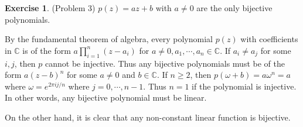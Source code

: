 \documentclass[12pt, psamsfonts]{amsart}
\theoremstyle{definition}
\newtheorem*{exer}{Exercise}
\theoremstyle{remark}
\numberwithin{equation}{section}
\begin{document}
\begin{exer}{(Problem 3)}
  $p(z) = az + b$ with $a \ne 0$ are the only bijective polynomials.

  By the fundamental theorem of algebra, every polynomial $p(z)$ with coefficients in $\mathbb{C}$ is of the form $a\prod_{i=1}^{n}(z - a_i)$ for $a \ne 0, a_1, \cdots, a_n \in \mathbb{C}$.
  If $a_i \ne a_j$ for some $i, j$, then $p$ cannot be injective.
  Thus any bijective polynomials must be of the form $a(z - b)^n$ for some $a \ne 0$ and $b \in \mathbb{C}$.
  If $n \geq 2$, then $p(\omega + b) = a\omega^n = a$ where $\omega = e^{2\pi i j / n}$ where $j = 0, \cdots, n - 1$.
  Thus $n = 1$ if the polynomial is injective.
  In other words, any bijective polynomial must be linear.

  On the other hand, it is clear that any non-constant linear function is bijective.
\end{exer}
\end{document}
